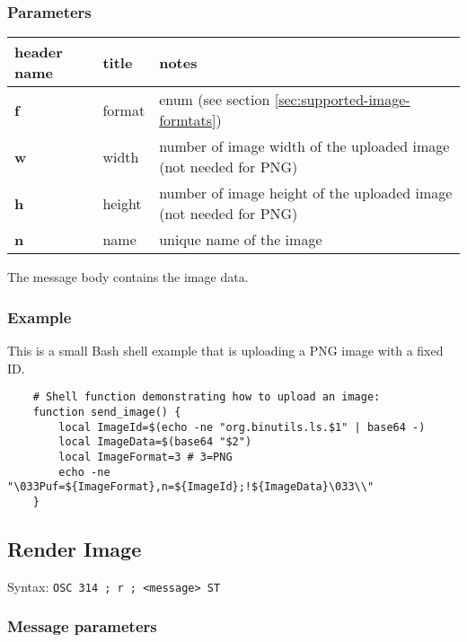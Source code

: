 \documentclass[a4paper]{article}
\newcommand{\code}[1]{\colorbox{light-gray}{\texttt{#1}}}
\begin{document}
\subsubsection*{Parameters}

\begin{tabular}{ |l|l|l| }
    \hline
    \textbf{header name}   & \textbf{title}   & \textbf{notes} \\
    \hline
    \textbf{f}       & format & enum (see section \ref{sec:supported-image-formtats}) \\
    \textbf{w}       & width & number of image width of the uploaded image (not needed for PNG) \\
    \textbf{h}       & height & number of image height of the uploaded image (not needed for PNG) \\
    \textbf{n}       & name & unique name of the image \\
    \hline
\end{tabular}

The message body contains the image data.

\subsubsection*{Example}

This is a small Bash shell example that is uploading a PNG image with a fixed ID.

\begin{verbatim}
    # Shell function demonstrating how to upload an image:
    function send_image() {
        local ImageId=$(echo -ne "org.binutils.ls.$1" | base64 -)
        local ImageData=$(base64 "$2")
        local ImageFormat=3 # 3=PNG
        echo -ne "\033Puf=${ImageFormat},n=${ImageId};!${ImageData}\033\\"
    }
\end{verbatim}

\pagebreak

\subsection{Render Image} %

Syntax: \code{OSC 314 ; r ; <message> ST}

\subsubsection*{Message parameters}
\end{document}
